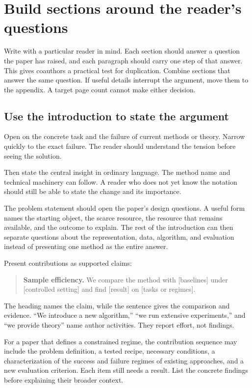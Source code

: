 \section{Build sections around the reader's questions}
\label{sec:sections}

Write with a particular reader in mind. Each section should answer a question
the paper has raised, and each paragraph should carry one step of that answer.
This gives coauthors a practical test for duplication. Combine sections that
answer the same question. If useful details interrupt the argument, move them
to the appendix. A target page count cannot make either decision.

\subsection{Use the introduction to state the argument}

Open on the concrete task and the failure of current methods or theory. Narrow
quickly to the exact failure. The reader should understand the tension before
seeing the solution.

Then state the central insight in ordinary language. The method name and
technical machinery can follow. A reader who does not yet know the notation
should still be able to state the change and its importance.

The problem statement should open the paper's design questions. A useful form
names the starting object, the scarce resource, the resource that remains
available, and the outcome to explain. The rest of the introduction can then
separate questions about the representation, data, algorithm, and evaluation
instead of presenting one method as the entire answer.

Present contributions as supported claims:

\begin{quote}
\textbf{Sample efficiency.} We compare the method with [baselines] under
[controlled setting] and find [result] on [tasks or regimes].
\end{quote}

The heading names the claim, while the sentence gives the comparison and
evidence. ``We introduce a new algorithm,'' ``we run extensive experiments,''
and ``we provide theory'' name author activities. They report effort, not
findings.

For a paper that defines a constrained regime, the contribution sequence may
include the problem definition, a tested recipe, necessary conditions, a
characterization of the success and failure regimes of existing approaches,
and a new evaluation criterion. Each item still needs a result. List the
concrete findings before explaining their broader context.

